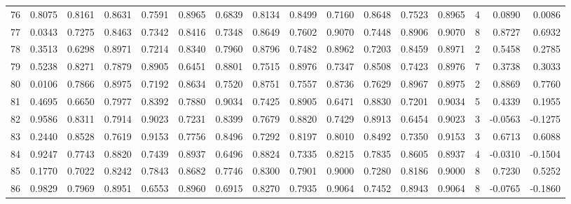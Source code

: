 \begin{tabular}{lrrrrrrrrrrrrrrr}
76  &      0.8075 &  0.8161 &  0.8631 &  0.7591 &  0.8965 &  0.6839 &  0.8134 &  0.8499 &  0.7160 &  0.8648 &   0.7523 &     0.8965 &      4 &                    0.0890 &                     0.0086 \\
77  &      0.0343 &  0.7275 &  0.8463 &  0.7342 &  0.8416 &  0.7348 &  0.8649 &  0.7602 &  0.9070 &  0.7448 &   0.8906 &     0.9070 &      8 &                    0.8727 &                     0.6932 \\
78  &      0.3513 &  0.6298 &  0.8971 &  0.7214 &  0.8340 &  0.7960 &  0.8796 &  0.7482 &  0.8962 &  0.7203 &   0.8459 &     0.8971 &      2 &                    0.5458 &                     0.2785 \\
79  &      0.5238 &  0.8271 &  0.7879 &  0.8905 &  0.6451 &  0.8801 &  0.7515 &  0.8976 &  0.7347 &  0.8508 &   0.7423 &     0.8976 &      7 &                    0.3738 &                     0.3033 \\
80  &      0.0106 &  0.7866 &  0.8975 &  0.7192 &  0.8634 &  0.7520 &  0.8751 &  0.7557 &  0.8736 &  0.7629 &   0.8967 &     0.8975 &      2 &                    0.8869 &                     0.7760 \\
81  &      0.4695 &  0.6650 &  0.7977 &  0.8392 &  0.7880 &  0.9034 &  0.7425 &  0.8905 &  0.6471 &  0.8830 &   0.7201 &     0.9034 &      5 &                    0.4339 &                     0.1955 \\
82  &      0.9586 &  0.8311 &  0.7914 &  0.9023 &  0.7231 &  0.8399 &  0.7679 &  0.8820 &  0.7429 &  0.8913 &   0.6454 &     0.9023 &      3 &                   -0.0563 &                    -0.1275 \\
83  &      0.2440 &  0.8528 &  0.7619 &  0.9153 &  0.7756 &  0.8496 &  0.7292 &  0.8197 &  0.8010 &  0.8492 &   0.7350 &     0.9153 &      3 &                    0.6713 &                     0.6088 \\
84  &      0.9247 &  0.7743 &  0.8820 &  0.7439 &  0.8937 &  0.6496 &  0.8824 &  0.7335 &  0.8215 &  0.7835 &   0.8605 &     0.8937 &      4 &                   -0.0310 &                    -0.1504 \\
85  &      0.1770 &  0.7022 &  0.8242 &  0.7843 &  0.8682 &  0.7746 &  0.8300 &  0.7901 &  0.9000 &  0.7280 &   0.8186 &     0.9000 &      8 &                    0.7230 &                     0.5252 \\
86  &      0.9829 &  0.7969 &  0.8951 &  0.6553 &  0.8960 &  0.6915 &  0.8270 &  0.7935 &  0.9064 &  0.7452 &   0.8943 &     0.9064 &      8 &                   -0.0765 &                    -0.1860 \\

\end{tabular}
